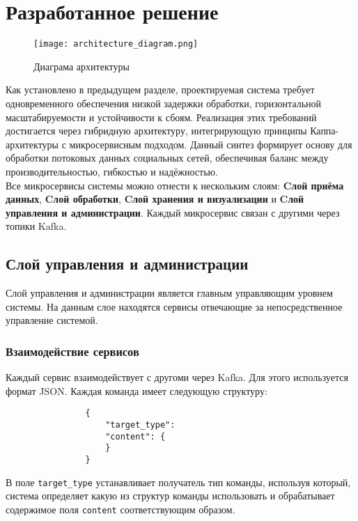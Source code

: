 \section{Разработанное решение}
\label{sec:Chapter4} 
    \begin{figure}
        \centering
        \texttt{[image: architecture\_diagram.png]}
        \caption{Диаграма архитектуры}
    \end{figure}
    Как установлено в предыдущем разделе, проектируемая система требует одновременного обеспечения низкой задержки обработки, горизонтальной масштабируемости и устойчивости к сбоям. Реализация этих требований достигается через гибридную архитектуру, интегрирующую принципы Каппа-архитектуры с микросервисным подходом. Данный синтез формирует основу для обработки потоковых данных социальных сетей, обеспечивая баланс между производительностью, гибкостью и надёжностью.\\

    Все микросервисы системы можно отнести к нескольким слоям: \textbf{Cлой приёма данных}, \textbf{Cлой обработки}, \textbf{Cлой хранения и визуализации} и \textbf{Cлой управления и администрации}. Каждый микросервис связан с другими через топики Kafka.

    \subsection{Слой управления и администрации}
        Слой управления и администрации является главным управляющим уровнем системы. На данным слое находятся сервисы отвечающие за непосредственное управление системой.
        
        \subsubsection{Взаимодействие сервисов}
            Каждый сервис взаимодействует с другоми через Kafka. Для этого используется формат JSON. Каждая команда имеет следующую структуру:
            \begin{lstlisting}
                {
                    "target_type":
                    "content": {
                    }
                }
            \end{lstlisting}
            В поле \texttt{target\_type} устанавливает получатель тип команды, используя который, система определяет какую из структур команды использовать и обрабатывает содержимое поля \texttt{content} соответствующим образом.


